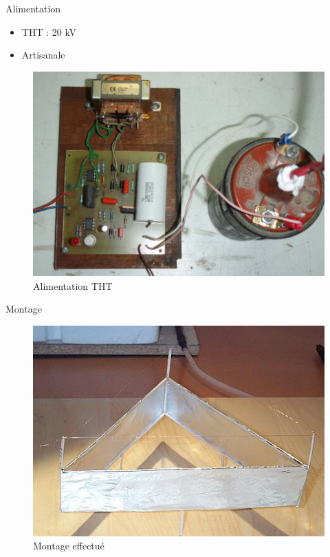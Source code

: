 \documentclass{beamer}
\begin{document}
		\begin{frame}{Alimentation}
			\begin{itemize}
				\item THT : 20 kV
				\item Artisanale
			\end{itemize}
			\begin{figure}
				\center
				\includegraphics[scale=0.2]{img/alim.jpg}
				\caption{Alimentation THT}
			\end{figure}
		\end{frame}
	
		\begin{frame}{Montage}
			\begin{figure}
				\center
				\includegraphics[scale=0.5]{img/photo2.jpg}
				\caption{Montage effectué}
			\end{figure}
		\end{frame}
	
\end{document}
